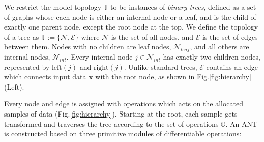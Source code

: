We restrict the model topology $\mathbb{T}$ to be instances of \textit{binary trees}, defined as a set of graphs whose each node is either an internal node or a leaf, and is the child of exactly one parent node, except the root node at the top. We define the topology of a tree as $\mathbb{T} := \{\mathcal{N}, \mathcal{E}\}$ where $\mathcal{N}$ is the set of all nodes, and  $\mathcal{E}$ is the set of edges between them. Nodes with no children are leaf nodes, $\mathcal{N}_{leaf}$, and all others are internal nodes, $\mathcal{N}_{int}$. Every internal node $j \in \mathcal{N}_{int}$ has exactly two children nodes, represented by $\mathrm{left}(j)$ and $\mathrm{right}(j)$. Unlike standard trees, $\mathcal{E}$ contains an edge which connects input data $\mathbf{x}$ with the root node, as shown in Fig.\ref{fig:hierarchy} (Left).

Every node and edge is assigned with operations which acts on the allocated samples of data (Fig.\ref{fig:hierarchy}). Starting at the root, each sample gets transformed and traverses the tree according to the set of operations $\mathbb{O}$. An ANT is constructed based on three primitive modules of differentiable operations: 


